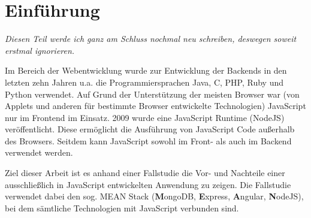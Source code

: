\chapter{Einführung}
\label{einfuerung-michi}

\emph{Diesen Teil werde ich ganz am Schluss nochmal neu schreiben,
deswegen soweit erstmal ignorieren.}

Im Bereich der Webentwicklung wurde zur Entwicklung der Backends in den
letzten zehn Jahren u.a. die Programmiersprachen Java, C, PHP, Ruby und
Python verwendet. Auf Grund der Unterstützung der meisten Browser war
(von Applets und anderen für bestimmte Browser entwickelte Technologien)
JavaScript nur im Frontend im Einsatz. 2009 wurde eine JavaScript
Runtime (NodeJS) veröffentlicht. Diese ermöglicht die Ausführung von
JavaScript Code außerhalb des Browsers. Seitdem kann JavaScript sowohl
im Front- als auch im Backend verwendet werden.

Ziel dieser Arbeit ist es anhand einer Fallstudie die Vor- und Nachteile
einer ausschließlich in JavaScript entwickelten Anwendung zu zeigen. Die
Fallstudie verwendet dabei den sog. MEAN Stack (\textbf{M}ongoDB,
\textbf{E}xpress, \textbf{A}ngular, \textbf{N}odeJS), bei dem sämtliche
Technologien mit JavaScript verbunden sind.